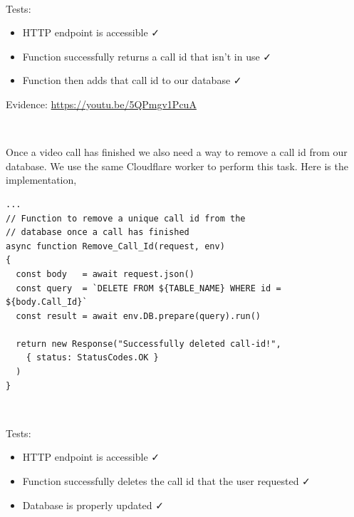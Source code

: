 {\color{gray} \hrulefill} \\ \vspace{0.2cm}

{\sffamily Tests:}

\begin{itemize}
  \item HTTP endpoint is accessible \faCheck \\
  \item Function successfully returns a call id that isn't in use \faCheck \\
  \item Function then adds that call id to our database \faCheck \\
\end{itemize}

{\sffamily Evidence:} \url{https://youtu.be/5QPmgv1PcuA}\\ \vspace{0.2cm}

{\color{gray} \hrulefill} \\ \vspace{0.2cm}

Once a video call has finished we also need a way to
remove a call id from our database. We use the same
Cloudflare worker to perform this task. Here is the
implementation,

\begin{verbatim}
...
// Function to remove a unique call id from the
// database once a call has finished
async function Remove_Call_Id(request, env)
{
  const body   = await request.json()
  const query  = `DELETE FROM ${TABLE_NAME} WHERE id = ${body.Call_Id}`
  const result = await env.DB.prepare(query).run()

  return new Response("Successfully deleted call-id!",
    { status: StatusCodes.OK }
  )
}
\end{verbatim}

{\color{gray} \hrulefill} \\ \vspace{0.2cm}

{\sffamily Tests:}

\begin{itemize}
  \item HTTP endpoint is accessible \faCheck \\
  \item Function successfully deletes the call id that the user requested \faCheck \\
  \item Database is properly updated \faCheck \\
\end{itemize}


